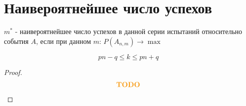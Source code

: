     \section{Наивероятнейшее число успехов}
    \begin{opr}
        \(m^{*}\) - наивероятнейшее число успехов в данной серии
        испытаний относительно события \(A\), если при данном \(m\): \(P(A_{n, m})\to \max\)
    \end{opr}
    \begin{equation}
        pn - q \leq k \leq pn + q
    \end{equation}
    \begin{proof}
        \begin{equation}
            \begin{align*}
                \color{YellowOrange}\textbf{TODO}
            \end{align*}
        \end{equation}
    \end{proof}

